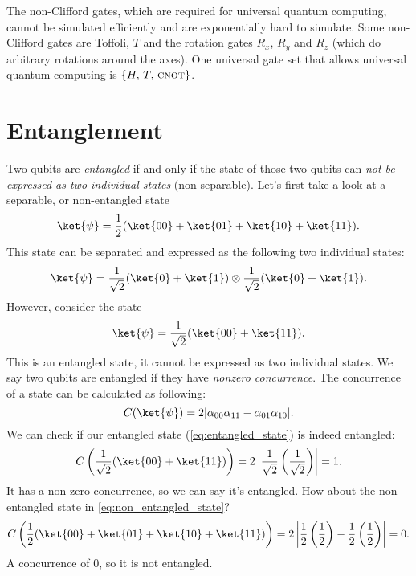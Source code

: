 The non-Clifford gates, which are required for universal quantum computing, cannot be simulated efficiently and are exponentially hard to simulate. Some non-Clifford gates are Toffoli, $T$ and the rotation gates $R_x$, $R_y$ and $R_z$ (which do arbitrary rotations around the axes). One universal gate set that allows universal quantum computing is $\{H,\, T,\, \textsc{cnot}\}$.

\section{Entanglement}
Two qubits are \emph{entangled} if and only if the state of those two qubits can \emph{not be expressed as two individual states} (non-separable). Let's first take a look at a separable, or non-entangled state
\begin{equation} \label{eq:non_entangled_state}
  \ket{\psi} = \dfrac{1}{2}(\ket{00} + \ket{01} + \ket{10} + \ket{11}).
\end{equation}
This state can be separated and expressed as the following two individual states:
\begin{equation}
  \ket{\psi} = \dfrac{1}{\sqrt2}(\ket{0} + \ket{1}) \otimes \dfrac{1}{\sqrt2}(\ket{0} + \ket{1}).
\end{equation}
However, consider the state
\begin{equation} \label{eq:entangled_state}
  \ket{\psi} = \dfrac{1}{\sqrt2}(\ket{00} + \ket{11}).
\end{equation}
This is an entangled state, it cannot be expressed as two individual states. We say two qubits are entangled if they have \emph{nonzero concurrence}. The concurrence of a state can be calculated as following:
\begin{equation}
  C(\ket{\psi}) = 2|\alpha_{00}\alpha_{11} - \alpha_{01}\alpha_{10}|.
\end{equation}
We can check if our entangled state (\ref{eq:entangled_state}) is indeed entangled:
\begin{equation}
  C\left(\dfrac{1}{\sqrt2}(\ket{00} + \ket{11})\right) = 2\left|\dfrac{1}{\sqrt2}\left(\dfrac{1}{\sqrt2}\right)\right| = 1.
\end{equation}
It has a non-zero concurrence, so we can say it's entangled. How about the non-entangled state in \ref{eq:non_entangled_state}?
\begin{equation}
  C\left(\dfrac{1}{2}(\ket{00} + \ket{01} + \ket{10} + \ket{11})\right) = 2\left|\dfrac{1}{2}\left(\dfrac{1}{2}\right) - \dfrac{1}{2}\left(\dfrac{1}{2}\right)\right| = 0.
\end{equation}
A concurrence of 0, so it is not entangled.

